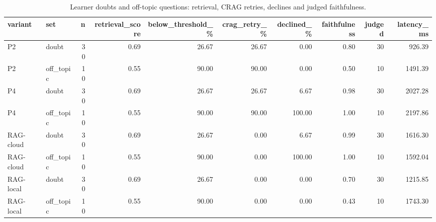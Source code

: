 \begin{table}[htbp]
\centering
\small
\caption{Learner doubts and off-topic questions: retrieval, CRAG retries, declines and judged faithfulness.}
\label{tab:doubts_summary}
\begin{tabular}{l l r r r r r r r r}
\toprule
variant & set & n & retrieval\_score & below\_threshold\_\% & crag\_retry\_\% & declined\_\% & faithfulness & judged & latency\_ms \\
\midrule
P2 & doubt & 30 & 0.69 & 26.67 & 26.67 & 0.00 & 0.80 & 30 & 926.39 \\
P2 & off\_topic & 10 & 0.55 & 90.00 & 90.00 & 0.00 & 0.50 & 10 & 1491.39 \\
P4 & doubt & 30 & 0.69 & 26.67 & 26.67 & 6.67 & 0.98 & 30 & 2027.28 \\
P4 & off\_topic & 10 & 0.55 & 90.00 & 90.00 & 100.00 & 1.00 & 10 & 2197.86 \\
RAG-cloud & doubt & 30 & 0.69 & 26.67 & 0.00 & 6.67 & 0.99 & 30 & 1616.30 \\
RAG-cloud & off\_topic & 10 & 0.55 & 90.00 & 0.00 & 100.00 & 1.00 & 10 & 1592.04 \\
RAG-local & doubt & 30 & 0.69 & 26.67 & 0.00 & 0.00 & 0.70 & 30 & 1215.85 \\
RAG-local & off\_topic & 10 & 0.55 & 90.00 & 0.00 & 0.00 & 0.43 & 10 & 1743.30 \\
\bottomrule
\end{tabular}
\end{table}
